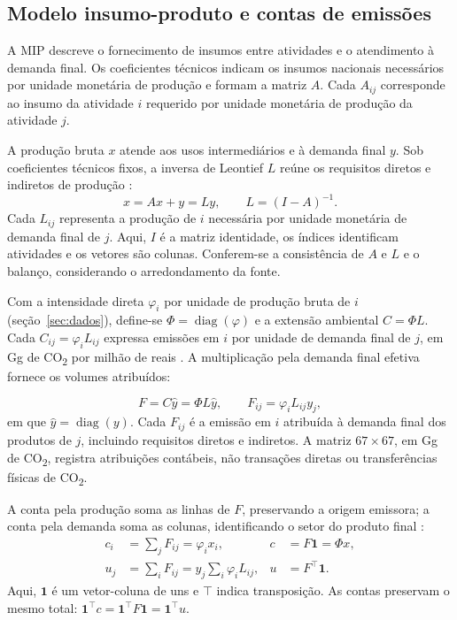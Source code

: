 \subsection{Modelo insumo-produto e contas de emissões}
\label{sec:derivacao}
\label{sec:atribuicoes}

A MIP descreve o fornecimento de insumos entre atividades e o atendimento à demanda final. Os coeficientes técnicos indicam os insumos nacionais necessários por unidade monetária de produção e formam a matriz $A$. Cada $A_{ij}$ corresponde ao insumo da atividade $i$ requerido por unidade monetária de produção da atividade $j$.

A produção bruta $x$ atende aos usos intermediários e à demanda final $y$. Sob coeficientes técnicos fixos, a inversa de Leontief $L$ reúne os requisitos diretos e indiretos de produção \parencite{millerBlair2009}:
\begin{equation}
x=Ax+y=Ly,\qquad L=(I-A)^{-1}.
\label{eq:leontief}
\end{equation}
Cada $L_{ij}$ representa a produção de $i$ necessária por unidade monetária de demanda final de $j$. Aqui, $I$ é a matriz identidade, os índices identificam atividades e os vetores são colunas. Conferem-se a consistência de $A$ e $L$ e o balanço, considerando o arredondamento da fonte.

Com a intensidade direta $\varphi_i$ por unidade de produção bruta de $i$ (seção~\ref{sec:dados}), define-se $\Phi=\operatorname{diag}(\varphi)$ e a extensão ambiental $C=\Phi L$. Cada $C_{ij}=\varphi_iL_{ij}$ expressa emissões em $i$ por unidade de demanda final de $j$, em Gg de CO\textsubscript{2} por milhão de reais \parencite{sanguinetAzzoni2024}. A multiplicação pela demanda final efetiva fornece os volumes atribuídos:

\begin{equation}
F=C\widehat y=\Phi L\widehat y,\qquad F_{ij}=\varphi_iL_{ij}y_j,
\label{eq:matriz-atribuicao}
\end{equation}
em que $\widehat y=\operatorname{diag}(y)$. Cada $F_{ij}$ é a emissão em $i$ atribuída à demanda final dos produtos de $j$, incluindo requisitos diretos e indiretos. A matriz $67\times67$, em Gg de CO\textsubscript{2}, registra atribuições contábeis, não transações diretas ou transferências físicas de CO\textsubscript{2}.

A conta pela produção soma as linhas de $F$, preservando a origem emissora; a conta pela demanda soma as colunas, identificando o setor do produto final \parencite{marques2012}:
\begin{align}
c_i&=\sum_jF_{ij}=\varphi_i x_i, & c&=F\mathbf{1}=\Phi x,
\label{eq:conta-producao}
\\
u_j&=\sum_iF_{ij}=y_j\sum_i\varphi_iL_{ij}, & u&=F^\top\mathbf{1}.
\label{eq:conta-demanda}
\end{align}
Aqui, $\mathbf{1}$ é um vetor-coluna de uns e $\top$ indica transposição. As contas preservam o mesmo total: $\mathbf{1}^\top c=\mathbf{1}^\top F\mathbf{1}=\mathbf{1}^\top u$.


